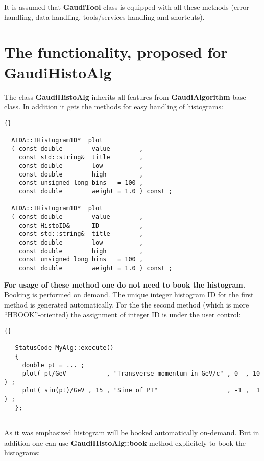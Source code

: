 \documentclass{lhcbnote}
\newcommand{\bftt}         {\ttfamily\bfseries}
\begin{document}
It is assumed that {\bftt{GaudiTool}} class is equipped with 
all these methods (error handling, data handling, 
tools/services handling and shortcuts).

\chapter{The functionality, proposed for {\bftt{GaudiHistoAlg}}}
The class {\bftt{GaudiHistoAlg}} inherits all features 
from {\bftt{GaudiAlgorithm}} base class. In addition it gets
the methods for easy handling of histograms:

\begin{scriptsize}
 \begin{lstlisting}{}
 
  AIDA::IHistogram1D*  plot 
  ( const double        value        ,
    const std::string&  title        ,
    const double        low          ,
    const double        high         ,
    const unsigned long bins   = 100 ,
    const double        weight = 1.0 ) const ;

  AIDA::IHistogram1D*  plot      
  ( const double        value        ,
    const HistoID&      ID           , 
    const std::string&  title        ,
    const double        low          ,
    const double        high         ,
    const unsigned long bins   = 100 ,
    const double        weight = 1.0 ) const ;

 \end{lstlisting}
\end{scriptsize}

{\bf{For usage of these method one do not need to book the histogram.}} 
Booking is performed on demand. The unique integer histogram ID 
for the first method is generated automatically. 
For the the second method (which is more ``HBOOK''-oriented) 
the assignment of integer ID is under the user control:

\begin{scriptsize}
 \begin{lstlisting}{}
   
   StatusCode MyAlg::execute() 
   {
     double pt = ... ;
     plot( pt/GeV           , "Transverse momentum in GeV/c" , 0  , 10 ) ;
     plot( sin(pt)/GeV , 15 , "Sine of PT"                   , -1 ,  1 ) ;
   };
   
 \end{lstlisting}
\end{scriptsize}

As it was emphasized histogram will be booked automatically on-demand.
But in addition one can use {\bftt{GaudiHistoAlg::book}} method explicitely to book 
the histograms:
\end{document}
